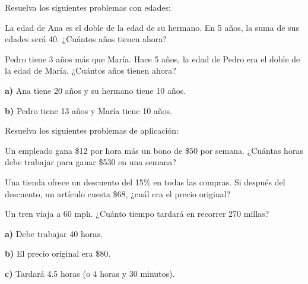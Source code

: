 \begin{exercise}
\problem Resuelva los siguientes problemas con edades:

\begin{exerciselist}
    \item La edad de Ana es el doble de la edad de su hermano. En 5 años, la suma de sus edades será 40. ¿Cuántos años tienen ahora?
    \item Pedro tiene 3 años más que María. Hace 5 años, la edad de Pedro era el doble de la edad de María. ¿Cuántos años tienen ahora?
\end{exerciselist}

\begin{solucion}
\textbf{a)} Ana tiene 20 años y su hermano tiene 10 años.

\textbf{b)} Pedro tiene 13 años y María tiene 10 años.
\end{solucion}
\end{exercise}

\begin{exercise}
\problem Resuelva los siguientes problemas de aplicación:

\begin{exerciselist}
    \item Un empleado gana \$12 por hora más un bono de \$50 por semana. ¿Cuántas horas debe trabajar para ganar \$530 en una semana?
    \item Una tienda ofrece un descuento del 15\% en todas las compras. Si después del descuento, un artículo cuesta \$68, ¿cuál era el precio original?
    \item Un tren viaja a 60 mph. ¿Cuánto tiempo tardará en recorrer 270 millas?
\end{exerciselist}

\begin{solucion}
\textbf{a)} Debe trabajar 40 horas.

\textbf{b)} El precio original era \$80.

\textbf{c)} Tardará 4.5 horas (o 4 horas y 30 minutos).
\end{solucion}
\end{exercise}

